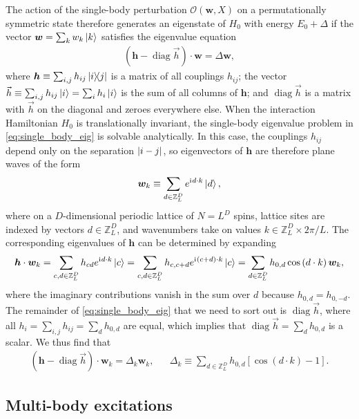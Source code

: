 \documentclass[nofootinbib,notitlepage,11pt]{revtex4-2}
\newcommand{\p}[1]{\left(#1\right)} %
\renewcommand{\sp}[1]{\left[#1\right]} %
\renewcommand{\c}{\cdot} %
\newcommand{\m}{\bm} %
\renewcommand{\v}{\vec} %
\newcommand{\1}{\mathds{1}}
\renewcommand{\i}{\mathrm{i}\mkern1mu}
\renewcommand{\O}{\mathcal{O}}
\newcommand{\ZZ}{\mathbb{Z}}
\DeclareMathOperator{\diag}{diag}
\begin{document}
The action of the single-body perturbation $\O\p{\m w,X}$ on a
permutationally symmetric state therefore generates an eigenstate of
$H_0$ with energy $E_0+\Delta$ if the vector $\m w=\sum_k w_k \ket{k}$
satisfies the eigenvalue equation
\begin{align}
  \p{\m h - \diag\v h} \c \m w = \Delta \m w,
  \label{eq:single_body_eig}
\end{align}
where $\m h\equiv\sum_{i,j} h_{ij} \op{i}{j}$ is a matrix of all
couplings $h_{ij}$; the vector
$\v h \equiv \sum_{i,j} h_{ij} \ket{i} = \sum_i h_i \ket{i}$ is the
sum of all columns of $\m h$; and $\diag\v h$ is a matrix with $\v h$
on the diagonal and zeroes everywhere else.  When the interaction
Hamiltonian $H_0$ is translationally invariant, the single-body
eigenvalue problem in \eqref{eq:single_body_eig} is solvable
analytically.  In this case, the couplings $h_{ij}$ depend only on the
separation $\abs{i-j}$, so eigenvectors of $\m h$ are therefore plane
waves of the form
\begin{align}
  \m w_k \equiv \sum_{d\in\ZZ_L^D} e^{\i d\c k} \ket{d},
\end{align}
where on a $D$-dimensional periodic lattice of $N=L^D$ spins, lattice
sites are indexed by vectors $d\in\ZZ_L^D$, and wavenumbers take on
values $k\in\ZZ_L^D\times2\pi/L$.  The corresponding eigenvalues of
$\m h$ can be determined by expanding
\begin{align}
  \m h \c \m w_k
  = \sum_{c,d\in\ZZ_L^D} h_{cd} e^{\i d\c k} \ket{c}
  = \sum_{c,d\in\ZZ_L^D} h_{c,c+d} e^{\i\p{c+d}\c k} \ket{c}
  = \sum_{d\in\ZZ_L^D} h_{0,d} \cos\p{d\c k} \m w_k,
\end{align}
where the imaginary contributions vanish in the sum over $d$ because
$h_{0,d}=h_{0,-d}$.  The remainder of \eqref{eq:single_body_eig} that
we need to sort out is $\diag\v h$, where all
$h_i = \sum_{i,j}h_{ij} = \sum_d h_{0,d}$ are equal, which implies
that $\diag\v h = \sum_d h_{0,d}$ is a scalar.  We thus find that
\begin{align}
  \p{\m h - \diag\v h} \c \m w_k = \Delta_k \m w_k,
  &&
  \Delta_k \equiv \sum_{d\in\ZZ_L^D} h_{0,d} \sp{\cos\p{d\c k}-1}.
\end{align}

\subsection{Multi-body excitations}
\end{document}
